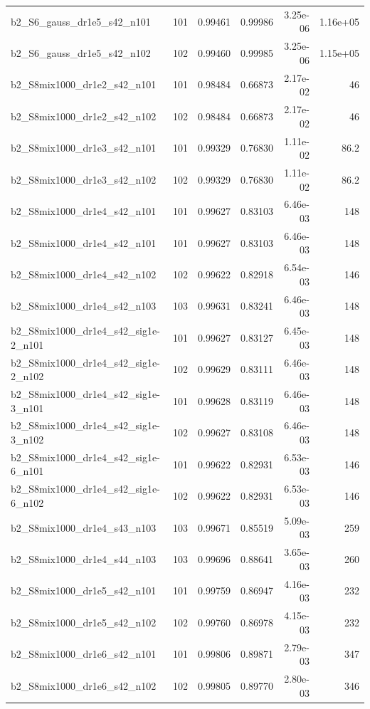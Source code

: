\begin{tabular}{lrrrrr}
b2\_S6\_gauss\_dr1e5\_s42\_n101 & 101 & 0.99461 & 0.99986 & 3.25e-06 & 1.16e+05 \\
b2\_S6\_gauss\_dr1e5\_s42\_n102 & 102 & 0.99460 & 0.99985 & 3.25e-06 & 1.15e+05 \\
b2\_S8mix1000\_dr1e2\_s42\_n101 & 101 & 0.98484 & 0.66873 & 2.17e-02 & 46 \\
b2\_S8mix1000\_dr1e2\_s42\_n102 & 102 & 0.98484 & 0.66873 & 2.17e-02 & 46 \\
b2\_S8mix1000\_dr1e3\_s42\_n101 & 101 & 0.99329 & 0.76830 & 1.11e-02 & 86.2 \\
b2\_S8mix1000\_dr1e3\_s42\_n102 & 102 & 0.99329 & 0.76830 & 1.11e-02 & 86.2 \\
b2\_S8mix1000\_dr1e4\_s42\_n101 & 101 & 0.99627 & 0.83103 & 6.46e-03 & 148 \\
b2\_S8mix1000\_dr1e4\_s42\_n101 & 101 & 0.99627 & 0.83103 & 6.46e-03 & 148 \\
b2\_S8mix1000\_dr1e4\_s42\_n102 & 102 & 0.99622 & 0.82918 & 6.54e-03 & 146 \\
b2\_S8mix1000\_dr1e4\_s42\_n103 & 103 & 0.99631 & 0.83241 & 6.46e-03 & 148 \\
b2\_S8mix1000\_dr1e4\_s42\_sig1e-2\_n101 & 101 & 0.99627 & 0.83127 & 6.45e-03 & 148 \\
b2\_S8mix1000\_dr1e4\_s42\_sig1e-2\_n102 & 102 & 0.99629 & 0.83111 & 6.46e-03 & 148 \\
b2\_S8mix1000\_dr1e4\_s42\_sig1e-3\_n101 & 101 & 0.99628 & 0.83119 & 6.46e-03 & 148 \\
b2\_S8mix1000\_dr1e4\_s42\_sig1e-3\_n102 & 102 & 0.99627 & 0.83108 & 6.46e-03 & 148 \\
b2\_S8mix1000\_dr1e4\_s42\_sig1e-6\_n101 & 101 & 0.99622 & 0.82931 & 6.53e-03 & 146 \\
b2\_S8mix1000\_dr1e4\_s42\_sig1e-6\_n102 & 102 & 0.99622 & 0.82931 & 6.53e-03 & 146 \\
b2\_S8mix1000\_dr1e4\_s43\_n103 & 103 & 0.99671 & 0.85519 & 5.09e-03 & 259 \\
b2\_S8mix1000\_dr1e4\_s44\_n103 & 103 & 0.99696 & 0.88641 & 3.65e-03 & 260 \\
b2\_S8mix1000\_dr1e5\_s42\_n101 & 101 & 0.99759 & 0.86947 & 4.16e-03 & 232 \\
b2\_S8mix1000\_dr1e5\_s42\_n102 & 102 & 0.99760 & 0.86978 & 4.15e-03 & 232 \\
b2\_S8mix1000\_dr1e6\_s42\_n101 & 101 & 0.99806 & 0.89871 & 2.79e-03 & 347 \\
b2\_S8mix1000\_dr1e6\_s42\_n102 & 102 & 0.99805 & 0.89770 & 2.80e-03 & 346 \\
\bottomrule
\end{tabular}